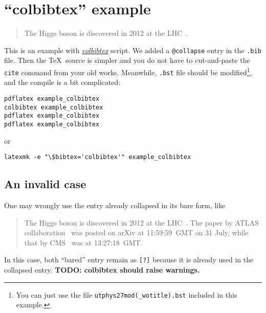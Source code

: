 \documentclass{article}
\newcommand\TODO[1]{{\color{red} \textbf{TODO: #1}}}
\begin{document}
\section*{``colbibtex'' example}
\begin{quote}
The Higgs boson is discovered in 2012 at the LHC~\cite{HiggsDiscovery}.
\end{quote}

This is an example with \href{https://github.com/misho104/colbibtex}{\emph{colbibtex}} script.
We added a \texttt{@collapse} entry in the \texttt{.bib} file.
Then the \TeX\ source is simpler and you do not have to cut-and-paste the \texttt{\\cite} command from your old works.
Meanwhile, \texttt{.bst} file should be modified\footnote{%
  You can just use the file \texttt{utphys27mod(\_wotitle).bst} included in this example.
}, and the compile is a bit complicated:
\begin{lstlisting}
pdflatex example_colbibtex
colbibtex example_colbibtex
pdflatex example_colbibtex
pdflatex example_colbibtex
\end{lstlisting}
or
\begin{lstlisting}
latexmk -e "\$bibtex='colbibtex'" example_colbibtex
\end{lstlisting}

\subsection*{An invalid case}
One may wrongly use the entry already collapsed in its bare form, like
\begin{quote}
The Higgs boson is discovered in 2012 at the LHC~\cite{HiggsDiscovery}.
The paper by ATLAS collaboration~\cite{Aad:2012tfa} was posted on arXiv at 11:59:59~GMT on 31 July, while that by CMS~\cite{Chatrchyan:2012xdj} was at 13:27:18~GMT.
\end{quote}
In this case, both ``bared'' entry remain as \texttt{[?]} because it is already used in the collapsed entry.
\TODO{colbibtex should raise warnings.}

\end{document}
